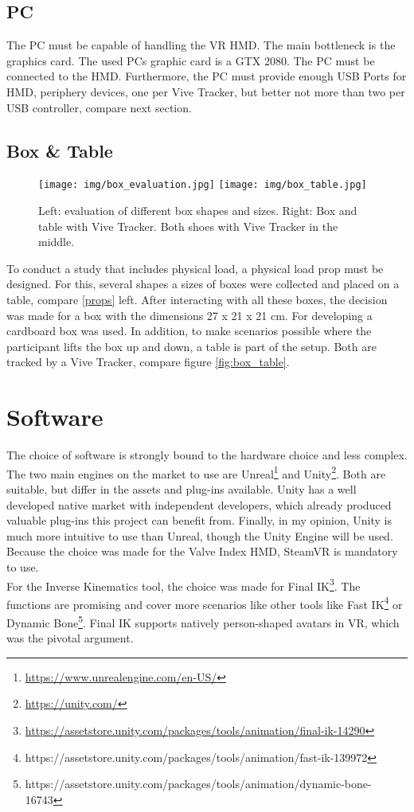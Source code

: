 \subsection{PC}
The PC must be capable of handling the VR HMD. The main bottleneck is the graphics card. The used PCs graphic card is a GTX 2080. The PC must be connected to the HMD. Furthermore, the PC must provide enough USB Ports for HMD, periphery devices, one per Vive Tracker, but better not more than two per USB controller, compare next section.

\subsection{Box \& Table}
\begin{figure}
	\centering
	\texttt{[image: img/box\_evaluation.jpg]}
	\texttt{[image: img/box\_table.jpg]}
	\caption{Left: evaluation of different box shapes and sizes. Right: Box and table with Vive Tracker. Both shoes with Vive Tracker in the middle.}
	\label{fig:props}
\end{figure}

To conduct a study that includes physical load, a physical load prop must be designed. For this, several shapes a sizes of boxes were collected and placed on a table, compare \ref{props} left. After interacting with all these boxes, the decision was made for a box with the dimensions 27 x 21 x 21 cm. For developing a cardboard box was used. In addition, to make scenarios possible where the participant lifts the box up and down, a table is part of the setup. Both are tracked by a Vive Tracker, compare figure \ref{fig:box_table}.

\section{Software}
The choice of software is strongly bound to the hardware choice and less complex. The two main engines on the market to use are Unreal\footnote{\href{https://www.unrealengine.com/en-US/}{https://www.unrealengine.com/en-US/}} and Unity\footnote{\href{https://unity.com/}{https://unity.com/}}. Both are suitable, but differ in the assets and plug-ins available. Unity has a well developed native market with independent developers, which already produced valuable plug-ins this project can benefit from. Finally, in my opinion, Unity is much more intuitive to use than Unreal, though the Unity Engine will be used.\\
Because the choice was made for the Valve Index HMD, SteamVR is mandatory to use.\\
For the Inverse Kinematics tool, the choice was made for Final IK\footnote{\href{https://assetstore.unity.com/packages/tools/animation/final-ik-14290}{https://assetstore.unity.com/packages/tools/animation/final-ik-14290}}. The functions are promising and cover more scenarios like other tools like Fast IK\footnote{https://assetstore.unity.com/packages/tools/animation/fast-ik-139972} or Dynamic Bone\footnote{https://assetstore.unity.com/packages/tools/animation/dynamic-bone-16743}. Final IK supports natively person-shaped avatars in VR, which was the pivotal argument.

